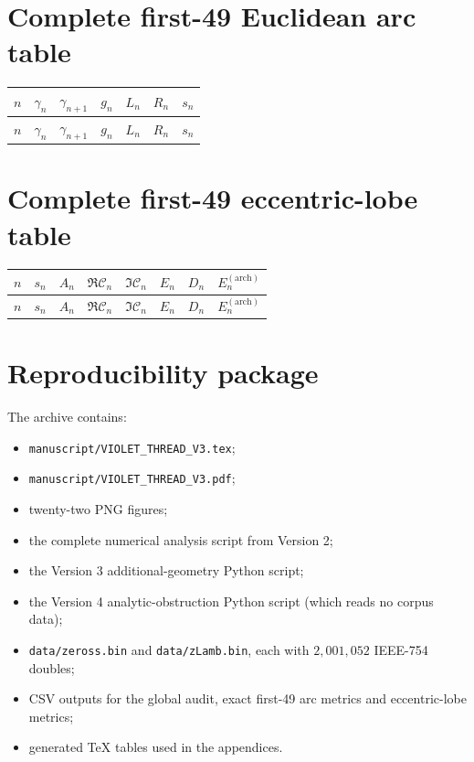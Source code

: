 \documentclass[11pt]{article}
\theoremstyle{definition}
\begin{document}
\appendix

\section{Complete first-49 Euclidean arc table}
\small
\begin{longtable}{rrrrrrr}
\toprule
$n$ & $\gamma_n$ & $\gamma_{n+1}$ & $g_n$ & $L_n$ & $R_n$ & $s_n$\\
\midrule
\endfirsthead
\toprule
$n$ & $\gamma_n$ & $\gamma_{n+1}$ & $g_n$ & $L_n$ & $R_n$ & $s_n$\\
\midrule
\endhead

\end{longtable}
\normalsize

\section{Complete first-49 eccentric-lobe table}
\scriptsize
\begin{longtable}{rrrrrrrr}
\toprule
$n$ & $s_n$ & $A_n$ & $\Re\mathcal C_n$ & $\Im\mathcal C_n$ & $E_n$ & $D_n$ & $E_n^{(\mathrm{arch})}$\\
\midrule
\endfirsthead
\toprule
$n$ & $s_n$ & $A_n$ & $\Re\mathcal C_n$ & $\Im\mathcal C_n$ & $E_n$ & $D_n$ & $E_n^{(\mathrm{arch})}$\\
\midrule
\endhead

\end{longtable}
\normalsize

\section{Reproducibility package}

The archive contains:
\begin{itemize}[leftmargin=1.6em]
\item \texttt{manuscript/VIOLET\_THREAD\_V3.tex};
\item \texttt{manuscript/VIOLET\_THREAD\_V3.pdf};
\item twenty-two PNG figures;
\item the complete numerical analysis script from Version 2;
\item the Version 3 additional-geometry Python script;
\item the Version 4 analytic-obstruction Python script (which reads no corpus data);
\item \texttt{data/zeross.bin} and \texttt{data/zLamb.bin}, each with
$2{,}001{,}052$ IEEE-754 doubles;
\item CSV outputs for the global audit, exact first-49 arc metrics and
eccentric-lobe metrics;
\item generated TeX tables used in the appendices.
\end{itemize}
\end{document}
